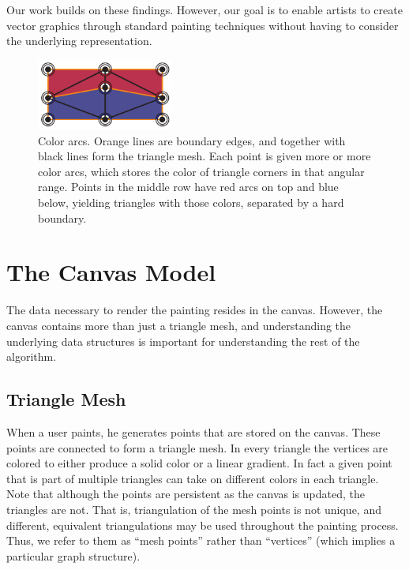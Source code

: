 \documentclass[review]{acmsiggraph}
\begin{document}
Our work builds on these findings. However, our goal is to enable artists to create vector
graphics through standard painting techniques without having to consider the underlying representation.

\begin{figure}
    \centering
        \includegraphics[width=0.4\textwidth]{images/colorarcsfinal}
    \caption{Color arcs. Orange lines are boundary edges, and together with black lines form the triangle
    mesh. Each point is given more or more color arcs, 
    which stores the color of triangle corners in that angular range.
    Points in the middle row have red arcs on top and blue below,
    yielding triangles with those colors, separated by a hard boundary.}
    \label{fig:arcs}
\end{figure}

\section{The Canvas Model}
The data necessary to render the painting resides in the canvas. However, the canvas contains more than just
a triangle mesh, and understanding the underlying data structures is important for 
understanding the rest of the algorithm.

\subsection{Triangle Mesh}
When a user paints, he generates points that are stored on the canvas. These points are
connected to form a triangle mesh. In every triangle the vertices are colored to either
produce a solid color or a linear gradient. In fact a given point that is part of
multiple triangles can take on different colors in each triangle. Note that although
the points are persistent as the canvas is updated, the triangles are not.  
That is, triangulation of the mesh points is not unique, and different, equivalent triangulations may 
be used throughout the painting process.
Thus, we refer to them as ``mesh points'' rather than ``vertices'' (which implies a particular graph
structure).
\end{document}
